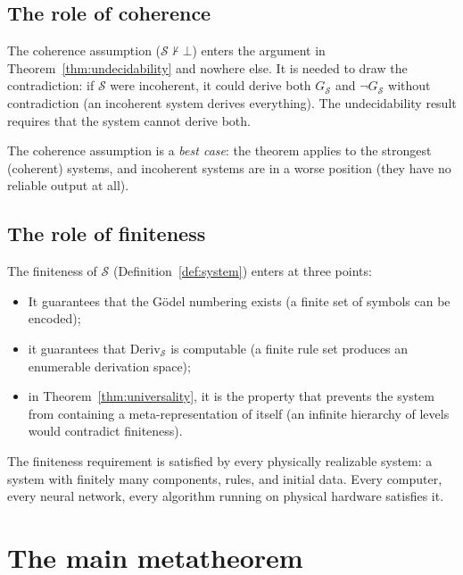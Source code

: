 \documentclass[11pt]{article}
\begin{document}
\subsection{The role of coherence}

The coherence assumption ($\mathcal{S} \not\vdash \bot$) enters the
argument in Theorem~\ref{thm:undecidability} and nowhere else. It is
needed to draw the contradiction: if $\mathcal{S}$ were incoherent, it
could derive both $G_{\mathcal{S}}$ and $\neg G_{\mathcal{S}}$ without
contradiction (an incoherent system derives everything). The
undecidability result requires that the system cannot derive both.

The coherence assumption is a \emph{best case}: the theorem applies to the 
strongest (coherent) systems, and incoherent systems are in a worse 
position (they have no reliable output at all).

\subsection{The role of finiteness}

The finiteness of $\mathcal{S}$ (Definition~\ref{def:system}) enters at
three points:
\begin{itemize}
  \item It guarantees that the G\"odel numbering exists (a finite
        set of symbols can be encoded);
  \item it guarantees that $\mathrm{Deriv}_{\mathcal{S}}$ is computable
        (a finite rule set produces an enumerable derivation space);
  \item in Theorem~\ref{thm:universality}, it is the property that
        prevents the system from containing a meta-representation of
        itself (an infinite hierarchy of levels would contradict
        finiteness).
\end{itemize}
The finiteness requirement is satisfied by every physically realizable
system: a system with finitely many components, rules, and initial data.
Every computer, every neural network, every algorithm running on
physical hardware satisfies it.


\section{The main metatheorem}
\label{sec:main}
\end{document}
